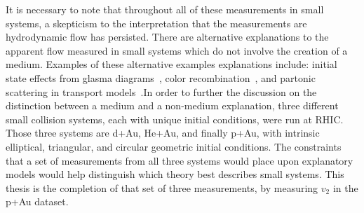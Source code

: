 It is necessary to note that throughout all of these measurements in small systems, a skepticism to the interpretation that the measurements are hydrodynamic flow has persisted. There are alternative explanations to the apparent flow measured in small systems which do not involve the creation of a medium. Examples of these alternative examples explanations include: initial state effects from glasma diagrams~\cite{PhysRevLett.108.262001}, color recombination~\cite{PhysRevLett.111.042001}, and partonic scattering in transport models~\cite{PhysRevLett.113.252301}.In order to further the discussion on the distinction between a medium and a non-medium explanation, three different small collision systems, each with unique initial conditions, were run at RHIC. Those three systems are d+Au, He+Au, and finally p+Au, with intrinsic  elliptical, triangular, and circular geometric initial conditions. The constraints that a set of measurements from all three systems would place upon explanatory models would help distinguish which theory best describes small systems. This thesis is the completion of that set of three measurements, by measuring $v_2$ in the p+Au dataset.






